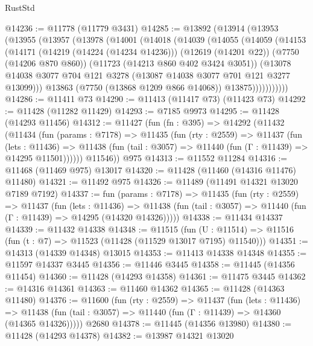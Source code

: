 \begin{lexlean}{RustStd}
\begin{coremodule}
@14236 := @11778 (@11779 @3431)
@14285 := @13892
    (@13914
      (@13953
        (@13955
          (@13957
            (@13978
              (@14001
                (@14018
                  (@14039
                    (@14055
                      (@14059
                        (@14153
                          (@14171
                            (@14219 (@14224 (@14234 @14236)))
                            (@12619 (@14201 @22))
                            (@7750 (@14206 @870 @860))
                            (@11723 (@14213 @860 @402 @3424 @3051))
                            (@13078
                              @14038
                              @3077
                              @704
                              @121
                              @3278
                              (@13087 @14038 @3077 @701 @121 @3277 @13099)))
                          @13863
                          (@7750 (@13868 @1209 @866 @14068))
                          @13875)))))))))))
@14286 := @11411 @73
@14290 := @11413 (@11417 @73) (@11423 @73)
@14292 := @11428 (@11282 @11429)
@14293 := @7185 @9973
@14295 := @11428 (@14293 @11456)
@14312 := @11427
    (fun (fn : @395) =>
    @14292
      (@11432
        (@11434
          (fun (params : @7178) =>
          @11435
            (fun (rty : @2559) =>
            @11437
              (fun (lets : @11436) =>
              @11438 (fun (tail : @3057) => @11440 (fun (Γ : @11439) => @14295 @11501))))))
        @11546))
    @975
@14313 := @11552 @11284
@14316 := @11468 (@11469 @975) @13017
@14320 := @11428 (@11460 (@14316 @11476) @11480)
@14321 := @11492 @975
@14326 := @11489 (@11491 @14321 @13020 @7189 @7192)
@14337 := fun (params : @7178) =>
  @11435
    (fun (rty : @2559) =>
    @11437
      (fun (lets : @11436) =>
      @11438 (fun (tail : @3057) => @11440 (fun (Γ : @11439) => @14295 (@14320 @14326)))))
@14338 := @11434 @14337
@14339 := @11432 @14338
@14348 := @11515
    (fun (U : @11514) => @11516 (fun (t : @7) => @11523 (@11428 (@11529 @13017 @7195) @11540)))
@14351 := @14313 (@14339 @14348) @13015
@14353 := @11413 @14338 @14348
@14355 := @11597 @14337 @3445
@14356 := @11446 @3445
@14358 := @11445 (@14356 @11454)
@14360 := @11428 (@14293 @14358)
@14361 := @11475 @3445
@14362 := @14316 @14361
@14363 := @11460 @14362
@14365 := @11428 (@14363 @11480)
@14376 := @11600
    (fun (rty : @2559) =>
    @11437
      (fun (lets : @11436) =>
      @11438 (fun (tail : @3057) => @11440 (fun (Γ : @11439) => @14360 (@14365 @14326)))))
    @2680
@14378 := @11445 (@14356 @13980)
@14380 := @11428 (@14293 @14378)
@14382 := @13987 @14321 @13020

\end{coremodule}
\end{lexlean}
